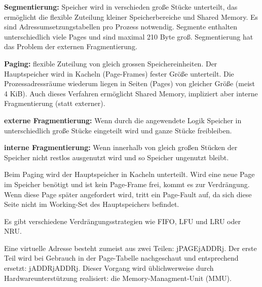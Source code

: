 \begin{answer}
  \textbf{Segmentierung:} Speicher wird in verschieden große Stücke unterteilt, das ermöglicht die flexible Zuteilung kleiner Speicherbereiche und Shared Memory. Es sind Adressumsetzungstabellen pro Prozess notwendig. Segmente enthalten unterschiedlich viele Pages und sind maximal 210 Byte groß. Segmentierung hat das Problem der externen Fragmentierung.

  \textbf{Paging:} flexible Zuteilung von gleich grossen Speichereinheiten. Der Hauptspeicher wird in Kacheln (Page-Frames)
  fester Größe unterteilt. Die Prozessadressräume wiederum liegen in Seiten (Pages) von
  gleicher Größe (meist 4 KiB). Auch dieses Verfahren ermöglicht Shared Memory, impliziert aber interne Fragmentierung (statt externer).

  \textbf{externe Fragmentierung:} Wenn durch die angewendete Logik Speicher in unterschiedlich große
  Stücke eingeteilt wird und ganze Stücke freibleiben.

  \textbf{interne Fragmentierung:} Wenn innerhalb von gleich großen Stücken der Speicher nicht restlos
  ausgenutzt wird und so Speicher ungenutzt bleibt.
\end{answer}

\begin{answer}
  Beim Paging wird der Hauptspeicher in Kacheln  unterteilt.
  Wird eine neue Page im Speicher benötigt und ist kein Page-Frame frei, kommt es zur Verdrängung.
  Wenn diese Page später angefordert wird, tritt ein Page-Fault auf, da sich diese Seite nicht im Working-Set des Hauptspeichers befindet.

  Es gibt verschiedene Verdrängungsstrategien wie FIFO, LFU und LRU oder NRU.
\end{answer}

\begin{answer}
  Eine virtuelle Adresse besteht zumeist aus zwei Teilen: jPAGEjADDRj. Der erste Teil wird bei Gebrauch in der Page-Tabelle nachgeschaut und entsprechend ersetzt: jADDRjADDRj.
  Dieser Vorgang wird üblichwerweise durch Hardwareunterstützung realisiert: die Memory-Managment-Unit (MMU).
\end{answer}

